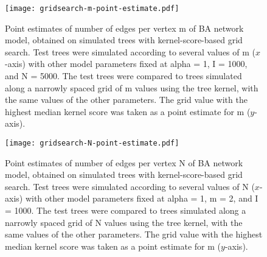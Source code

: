 \begin{figure}[ht]
  \centering
  \texttt{[image: gridsearch-m-point-estimate.pdf]}
  \caption[
      Point estimates of number of edges per vertex \gls{m} of \acrlong{BA}
      network model, obtained on simulated trees with kernel-score-based grid
      search.
  ]
  {
      Point estimates of number of edges per vertex \gls{m} of \acrlong{BA}
      network model, obtained on simulated trees with kernel-score-based grid
      search. Test trees were simulated according to several values of \gls{m}
      ($x$-axis) with other model parameters fixed at \gls{alpha} = 1, \gls{I}
      = 1000, and \gls{N} = 5000. The test trees were compared to trees
      simulated along a narrowly spaced grid of \gls{m} values using the tree
      kernel, with the same values of the other parameters. The grid value with
      the highest median kernel score was taken as a point estimate for \gls{m}
      ($y$-axis).
  }
  \label{fig:gridptm}
\end{figure}

\begin{figure}[ht]
  \centering
  \texttt{[image: gridsearch-N-point-estimate.pdf]}
  \caption[
      Point estimates of number of edges per vertex \gls{N} of \acrlong{BA}
      network model, obtained on simulated trees with kernel-score-based grid
      search.
  ]{
      Point estimates of number of edges per vertex \gls{N} of \acrlong{BA}
      network model, obtained on simulated trees with kernel-score-based grid
      search. Test trees were simulated according to several values of \gls{N}
      ($x$-axis) with other model parameters fixed at \gls{alpha} = 1, \gls{m}
      = 2, and \gls{I} = 1000. The test trees were compared to trees simulated
      along a narrowly spaced grid of \gls{N} values using the tree kernel,
      with the same values of the other parameters. The grid value with the
      highest median kernel score was taken as a point estimate for \gls{m}
      ($y$-axis).
  }
  \label{fig:gridptN}
\end{figure}

\clearpage


